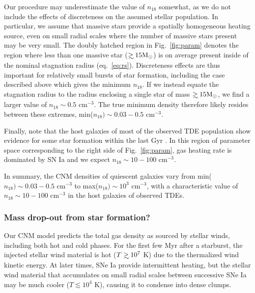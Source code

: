 \documentclass[usenatbib,fleqn]{mnras}
\newcommand\gsim{\mathrel{\rlap{\lower4pt\hbox{\hskip1pt$\sim$}}
    \raise1pt\hbox{$>$}}}
\newcommand{\Msun}{{\rm M_\odot}}
\begin{document}
Our procedure may underestimate the value of $n_{18}$ somewhat, as we
do not include the effects of discreteness on the assumed stellar
population.  In particular, we assume that massive stars provide a
spatially homogeneous heating source, even on small radial scales
where the number of massive stars present may be very small.  The
doubly hatched region in Fig.~\ref{fig:param} denotes the region where
less than one massive star ($\gsim 15 \Msun$) is on average present
inside of the nominal stagnation radius (eq.~\ref{eq:rs}).
Discreteness effects are thus important for relatively small bursts of
star formation, including the case described above which gives the
minimum $n_{18}$.  If we instead equate the stagnation radius to the
radius enclosing a single star of mass $\gsim 15 \Msun$, we find a
larger value of $n_{18}\sim 0.5$ cm$^{-3}$.  The true minimum density
therefore likely resides between these extremes, min($n_{18}) \sim
0.03-0.5$ cm$^{-3}$.

Finally, note that the host galaxies of most of the observed TDE population show evidence for some
star formation within the last Gyr \citep{French+2016}.  In this
region of parameter space corresponding to the right side of
Fig.~\ref{fig:param}, gas heating rate is dominated by SN Ia and we
expect $n_{18}\sim 10-100$ cm$^{-3}$.

In summary, the CNM densities of quiescent galaxies vary from
min($n_{18}) \sim 0.03-0.5$ cm$^{-3}$ to max($n_{18})\sim 10^{3}$
cm$^{-3}$, with a characteristic value of $n_{18}\sim 10-100$
cm$^{-3}$ in the host galaxies of observed TDEs.

\subsubsection{Mass drop-out from star formation?}

Our CNM model predicts the total gas density as sourced by
stellar winds, including both hot and cold phases.  For the first few
Myr after a starburst, the injected stellar wind material is hot
($T\gsim 10^{7}$ K) due to the thermalized wind kinetic energy.
At later times, SNe Ia provide intermittent heating, but the stellar wind
material that accumulates on small radial scales between successive SNe Ia
may be much cooler ($T \lesssim 10^{4}$ K), causing it to condense
into dense clumps.
\end{document}
